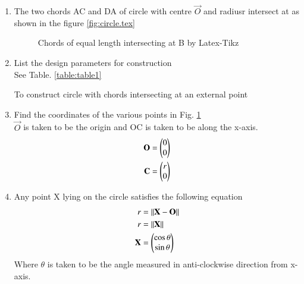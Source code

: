 %
\renewcommand{\theequation}{\theenumi}
\begin{enumerate}[label=\thesection.\arabic*.,ref=\thesection.\theenumi]

\item The two chords AC and DA of circle with centre $\vec{O}$ and radiusr intersect at  as shown in the figure \ref{fig:circle.tex}

\begin{figure}[!ht]
\centering
\resizebox{\columnwidth}{!}{}
\caption{Chords of equal length intersecting at B by Latex-Tikz}
\label{fig:circle}	
\end{figure}
%


%
%
\item List the design parameters for construction
\label{const:table1}
\\
\solution See Table. \ref{table:table1} 
%
\begin{table}[ht!]
\centering

\caption{To construct circle with chords intersecting at an external point}
\label{table:table1}	
\end{table}


\item Find the coordinates of the various points in Fig. \ref{fig:circle}
\label{const:circle_r}
\\
%
\solution $\vec{O}$ is taken to be the origin and OC is taken to be along the x-axis.
\begin{align}
\label{eq:constr_o}
\mathbf{O} &= \begin{pmatrix}0\\0\end{pmatrix} 
\\
\mathbf{C} &= \begin{pmatrix}r\\0\end{pmatrix} 
\label{eq:constr_c}
\end{align}

\item Any point X lying on the circle satisfies the following equation
 \begin{align}
r &=\left\lVert\mathbf{X}-\mathbf{O}\right\rVert
\\
r &=\left\lVert\mathbf{X}\right\rVert
\\
\mathbf{X} &= \begin{pmatrix}\cos \theta \\ \sin \theta\end{pmatrix}
\label{eq:point_on_circle}
\end{align}
Where $\theta$ is taken to be the angle measured in anti-clockwise direction from x-axis.


\end{enumerate}
